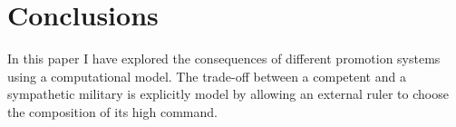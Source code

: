 
\section{Conclusions}
\label{sec:conclusions}

In this paper I have explored the consequences of different promotion systems
using a computational model. The trade-off between a competent and a sympathetic
military is explicitly model by allowing an external ruler to choose the
composition of its high command.


